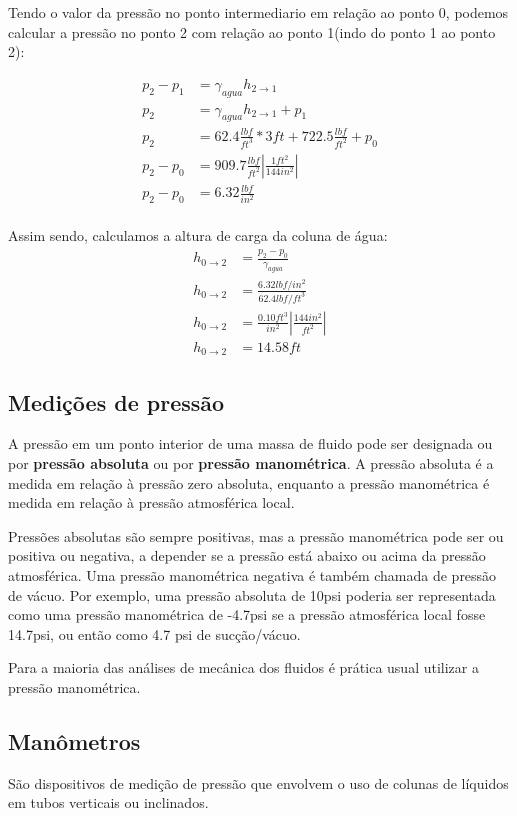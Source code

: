\documentclass{article}
\begin{document}
Tendo o valor da pressão no ponto intermediario em relação ao ponto 0, podemos calcular a pressão no ponto 2 com relação ao ponto 1(indo do ponto 1 ao ponto 2):

\begin{align*}
p_2 - p_1 &= \gamma_{agua}h_{2\rightarrow1} \\
p_2 &= \gamma_{agua}h_{2\rightarrow1} + p_1\\
p_2 &= 62.4 \frac{lbf}{ft^3} * 3ft + 722.5 \frac{lbf}{ft^2} + p_0\\
p_2 - p_0 &= 909.7 \frac{lbf}{ft^2} \left| \frac{1ft^2}{144in^2} \right| \\
p_2 - p_0 &= 6.32 \frac{lbf}{in^2}\\
\end{align*}

Assim sendo, calculamos a altura de carga da coluna de água:
\begin{align*}
h_{0\rightarrow2}&=\frac{p_2-p_0}{\gamma_{agua}}\\
h_{0\rightarrow2}&=\frac{6.32 lbf/in^2}{62.4 lbf/ft^3}\\
h_{0\rightarrow2}&=\frac{0.10 ft^3}{in^2} \left| \frac{144in^2}{ft^2} \right|\\ 
h_{0\rightarrow2}&=14.58ft
\end{align*}

\subsection{Medições de pressão}

A pressão em um ponto interior de uma massa de fluido pode ser designada ou por \textbf{pressão absoluta} ou por \textbf{pressão manométrica}. A pressão absoluta é a medida em relação à pressão zero absoluta, enquanto a pressão manométrica é medida em relação à pressão atmosférica local.

Pressões absolutas são sempre positivas, mas a pressão manométrica pode ser ou positiva ou negativa, a depender se a pressão está abaixo ou acima da pressão atmosférica. Uma pressão manométrica negativa é também chamada de pressão de vácuo. Por exemplo, uma pressão absoluta de 10psi poderia ser representada como uma pressão manométrica de -4.7psi se a pressão atmosférica local fosse 14.7psi, ou então como 4.7 psi de sucção/vácuo. 

Para a maioria  das análises de mecânica dos fluidos é prática usual utilizar a pressão manométrica.

\subsection{Manômetros}
São dispositivos de medição de pressão que envolvem o uso de colunas de líquidos em tubos verticais ou inclinados. 
\end{document}
